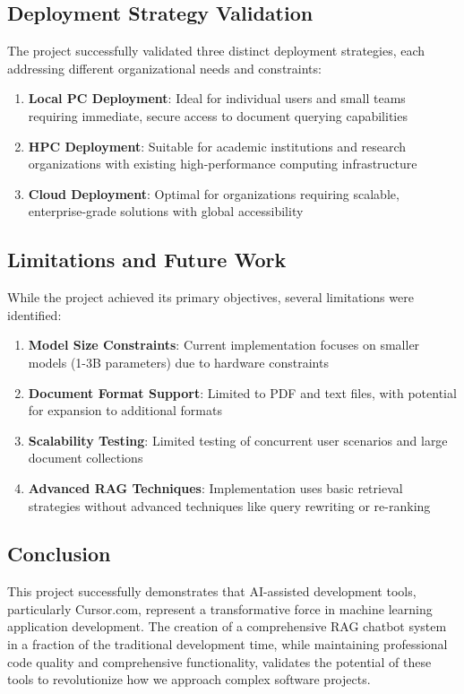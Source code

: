 \documentclass[12pt,letterpaper]{article}
\begin{document}
\subsection{Deployment Strategy Validation}

The project successfully validated three distinct deployment strategies, each addressing different organizational needs and constraints:

\begin{enumerate}
    \item \textbf{Local PC Deployment}: Ideal for individual users and small teams requiring immediate, secure access to document querying capabilities
    \item \textbf{HPC Deployment}: Suitable for academic institutions and research organizations with existing high-performance computing infrastructure
    \item \textbf{Cloud Deployment}: Optimal for organizations requiring scalable, enterprise-grade solutions with global accessibility
\end{enumerate}

\subsection{Limitations and Future Work}

While the project achieved its primary objectives, several limitations were identified:

\begin{enumerate}
    \item \textbf{Model Size Constraints}: Current implementation focuses on smaller models (1-3B parameters) due to hardware constraints
    \item \textbf{Document Format Support}: Limited to PDF and text files, with potential for expansion to additional formats
    \item \textbf{Scalability Testing}: Limited testing of concurrent user scenarios and large document collections
    \item \textbf{Advanced RAG Techniques}: Implementation uses basic retrieval strategies without advanced techniques like query rewriting or re-ranking
\end{enumerate}

\subsection{Conclusion}

This project successfully demonstrates that AI-assisted development tools, particularly Cursor.com, represent a transformative force in machine learning application development. The creation of a comprehensive RAG chatbot system in a fraction of the traditional development time, while maintaining professional code quality and comprehensive functionality, validates the potential of these tools to revolutionize how we approach complex software projects.
\end{document}
